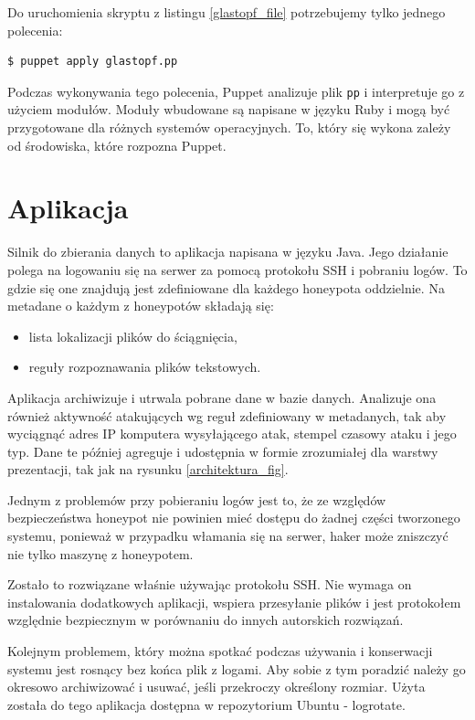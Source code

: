 \documentclass[runningheads,a4paper]{llncs}
\begin{document}
Do uruchomienia skryptu z listingu \ref{glastopf_file} potrzebujemy tylko jednego polecenia:
\begin{lstlisting}
$ puppet apply glastopf.pp
\end{lstlisting}
Podczas wykonywania tego polecenia, Puppet analizuje plik \texttt{pp} i interpretuje go z użyciem modułów. Moduły wbudowane są napisane w języku Ruby i mogą być przygotowane dla różnych systemów operacyjnych. To, który się wykona zależy od środowiska, które rozpozna Puppet.

\section{Aplikacja}

Silnik do zbierania danych to aplikacja napisana w języku Java. Jego działanie polega na logowaniu się na serwer za pomocą protokołu SSH i pobraniu logów. To gdzie się one znajdują jest zdefiniowane dla każdego honeypota oddzielnie. Na metadane o każdym z honeypotów składają się:
\begin{itemize}
\item lista lokalizacji plików do ściągnięcia,
\item reguły rozpoznawania plików tekstowych.
\end{itemize}

Aplikacja archiwizuje i utrwala pobrane dane w bazie danych. Analizuje ona również aktywność atakujących wg reguł zdefiniowany w metadanych, tak aby wyciągnąć adres IP komputera wysyłającego atak, stempel czasowy ataku i jego typ. Dane te później agreguje i udostępnia w formie zrozumiałej dla warstwy prezentacji, tak jak na rysunku \ref{architektura_fig}.

Jednym z problemów przy pobieraniu logów jest to, że ze względów bezpieczeństwa honeypot nie powinien mieć dostępu do żadnej części tworzonego systemu, ponieważ w przypadku włamania się na serwer, haker może zniszczyć nie tylko maszynę z honeypotem.

Zostało to rozwiązane właśnie używając protokołu SSH. Nie wymaga on instalowania dodatkowych aplikacji, wspiera przesyłanie plików i jest protokołem względnie bezpiecznym w porównaniu do innych autorskich rozwiązań.

Kolejnym problemem, który można spotkać podczas używania i konserwacji systemu jest rosnący bez końca plik z logami. Aby sobie z tym poradzić należy go okresowo archiwizować i usuwać, jeśli przekroczy określony rozmiar. Użyta została do tego aplikacja dostępna w repozytorium Ubuntu - logrotate.
\end{document}
